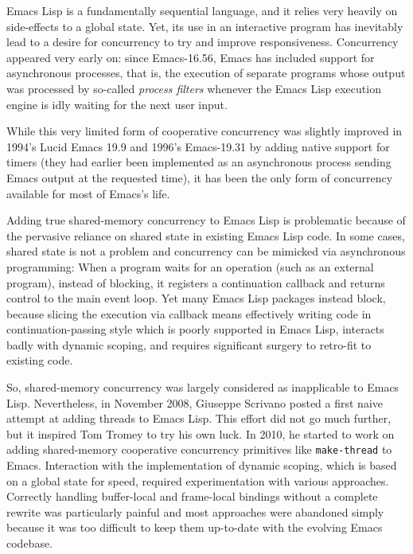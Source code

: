 \documentclass[format=acmsmall, review]{acmart}
\newcommand \Elisp {Emacs Lisp}
\begin{document}
\Elisp{} is a fundamentally sequential language, and it relies very heavily
on side-effects to a global state.  Yet, its use in an interactive program
has inevitably lead to a desire for concurrency to try and improve
responsiveness.  Concurrency appeared very early on: since
Emacs-16.56, Emacs has included support for asynchronous processes,
that is, the
execution of separate programs whose output was processed by so-called
\emph{process filters} whenever the \Elisp{} execution engine is idly
waiting for the next user input.

While this very limited form of cooperative concurrency was slightly
improved in 1994's Lucid Emacs 19.9 and 1996's Emacs-19.31 by adding native support for timers (they
had earlier been implemented as an asynchronous process sending Emacs output at
the requested time), it has been the only form of concurrency available for
most of Emacs's life.

Adding true shared-memory concurrency to \Elisp{} is problematic because of
the pervasive reliance on shared state in existing \Elisp{} code.  In some
cases, shared state is not a problem and concurrency can be mimicked via
asynchronous programming: When a program waits for an operation (such as an
external program), instead of blocking, it registers a continuation callback
and returns control to the main event loop.  Yet many \Elisp{} packages
instead block, because slicing the execution via callback means effectively
writing code in continuation-passing style which is poorly supported in
\Elisp{}, interacts badly with dynamic scoping, and requires significant
surgery to retro-fit to existing code.

So, shared-memory concurrency was largely considered as inapplicable to
\Elisp{}.  Nevertheless, in November 2008, Giuseppe Scrivano posted a first
naive attempt at adding threads to \Elisp{}.  This effort did not go much
further, but it inspired Tom Tromey to try his own luck.
In 2010, he started to work on adding shared-memory cooperative concurrency
primitives like \texttt{make-thread} to Emacs.  Interaction with the
implementation of dynamic scoping, which is based on a global state for
speed, required experimentation with various approaches.  Correctly handling
buffer-local and frame-local bindings without a complete rewrite was
particularly painful and most approaches were abandoned simply because it
was too difficult to keep them up-to-date with the evolving Emacs codebase.
\end{document}
